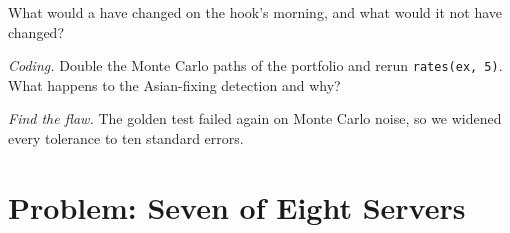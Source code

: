 \begin{exercise}[$\star\star$]\label{exo:pl:testing-and-continuous-delivery:6}
What would a  have changed on the hook's morning, and what would it not have changed?
\end{exercise}

\begin{exercise}[$\star\star\star$]\label{exo:pl:testing-and-continuous-delivery:7}
\emph{Coding.} Double the Monte Carlo paths of the portfolio and rerun \texttt{rates(ex, 5)}. What happens to the Asian-fixing detection and
why?
\end{exercise}

\begin{exercise}[$\star\star\star$]\label{exo:pl:testing-and-continuous-delivery:8}
\emph{Find the flaw.} \textquotedbl{}The golden test failed again on Monte Carlo noise, so we widened every tolerance to ten standard
errors.\textquotedbl{}
\end{exercise}

\section{Problem: Seven of Eight Servers}


